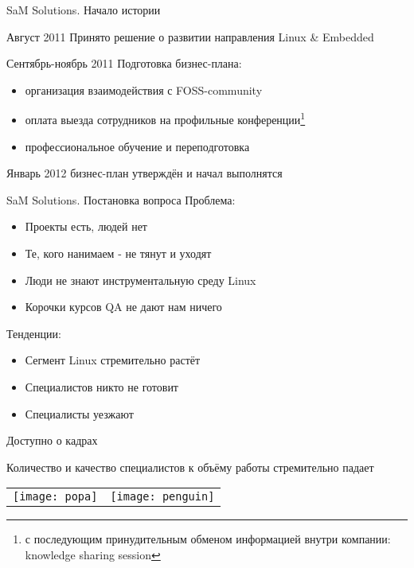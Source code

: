 \begin{frame}{SaM Solutions. Начало истории}
  \begin{block}{Август 2011}
    Принято решение о развитии направления Linux \& Embedded
  \end{block} \pause

  \begin{block}{Сентябрь-ноябрь 2011}
    Подготовка бизнес-плана:
    \begin{itemize}
      \item организация взаимодействия с FOSS-community
      \item оплата выезда сотрудников на профильные конференции\footnote{с последующим принудительным обменом информацией внутри компании: knowledge sharing session}
      \item профессиональное обучение и переподготовка
    \end{itemize}
  \end{block} \pause

  \begin{block}{Январь 2012}
    бизнес-план утверждён и начал выполнятся
  \end{block}

\end{frame}

\begin{frame}{SaM Solutions. Постановка вопроса}
  \alert{Проблема}:
  \begin{itemize}
    \item Проекты есть, людей нет
    \item Те, кого нанимаем - не тянут и уходят
    \item Люди не знают инструментальную среду Linux
    \item Корочки курсов QA не дают нам ничего 
  \end{itemize} \pause

  \alert{Тенденции}:
  \begin{itemize}
    \item Сегмент Linux стремительно растёт
    \item Специалистов никто не готовит 
    \item Специалисты уезжают
  \end{itemize} \pause
    
\end{frame}

\begin{frame}[fragile]{Доступно о кадрах}
 
  \begin{center}
    \Large \alert{Количество и качество \newline специалистов к объёму работы \newline стремительно падает} 
  \end{center}
  \begin{tabular}{l r}
    \texttt{[image: popa]} &
    \texttt{[image: penguin]} \\
  \end{tabular}

\end{frame}

